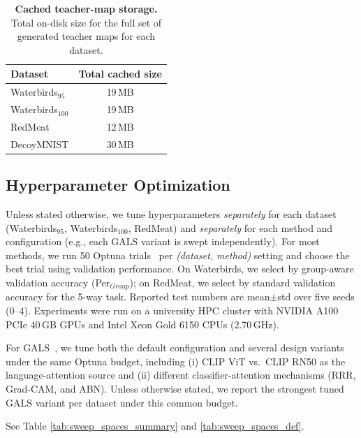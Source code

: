 \documentclass[10pt,twocolumn,letterpaper]{article}
\begin{document}
\begin{table}[h]
\centering
\caption{\textbf{Cached teacher-map storage.} Total on-disk size for the full set of generated teacher maps for each dataset.}
\label{tab:teacher_map_cost}
\small
\setlength{\tabcolsep}{8pt}
\renewcommand{\arraystretch}{1.1}
\begin{tabular}{lc}
\toprule
\textbf{Dataset} & \textbf{Total cached size} \\
\midrule
Waterbirds$_{95}$  & 19\,MB \\
Waterbirds$_{100}$ & 19\,MB \\
RedMeat            & 12\,MB \\
DecoyMNIST         & 30\,MB \\
\bottomrule
\end{tabular}
\end{table}





\subsection{Hyperparameter Optimization}
\label{sec:hparam_opt}

Unless stated otherwise, we tune hyperparameters \emph{separately} for each dataset (Waterbirds$_{95}$, Waterbirds$_{100}$, RedMeat) and \emph{separately} for each method and configuration (e.g., each GALS variant is swept independently). For most methods, we run 50 Optuna trials~\cite{akiba2019optuna} per \emph{(dataset, method)} setting and choose the best trial using validation performance. On Waterbirds, we select by group-aware validation accuracy (Per$_{Group}$); on RedMeat, we select by standard validation accuracy for the 5-way task. Reported test numbers are mean$\pm$std over five seeds (0--4). Experiments were run on a university HPC cluster with NVIDIA A100 PCIe 40\,GB GPUs and Intel Xeon Gold 6150 CPUs (2.70\,GHz).


For GALS~\cite{petryk2022guiding}, we tune both the default configuration and several design variants under the same Optuna budget, including (i) CLIP ViT vs.\ CLIP RN50 as the language-attention source and (ii) different classifier-attention mechanisms (RRR, Grad-CAM, and ABN). Unless otherwise stated, we report the strongest tuned GALS variant per dataset under this common budget.

See Table \ref{tab:sweep_spaces_summary} and \ref{tab:sweep_spaces_def}. 
\end{document}
